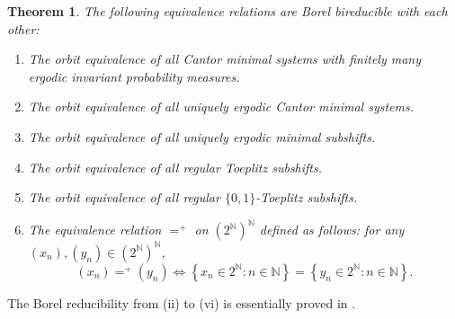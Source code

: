 \documentclass{amsart}
\newtheorem{theorem}{Theorem}[section]
\theoremstyle{definition}
\theoremstyle{problem}
\theoremstyle{remark}
\numberwithin{equation}{section}
\begin{document}
\begin{theorem} \label{thm:main1} The following equivalence relations are Borel bireducible with each other:
\begin{enumerate}
\item[\rm (i)] The orbit equivalence of all Cantor  minimal systems with finitely many ergodic invariant probability measures.
\item[\rm (ii)] The orbit equivalence of all uniquely ergodic Cantor minimal systems.
\item[\rm (iii)] The orbit equivalence of all uniquely ergodic minimal subshifts.
\item[\rm (iv)] The orbit equivalence of all regular Toeplitz subshifts.
\item[\rm (v)] The orbit equivalence of all regular $\{0,1\}$-Toeplitz subshifts.
\item[\rm (vi)] The equivalence relation $=^+$ on $(2^{\mathbb{N}})^{\mathbb{N}}$ defined as follows: for any $(x_n), (y_n)\in (2^{\mathbb{N}})^{\mathbb{N}}$, 
$$ (x_n)=^+(y_n)\iff \left\{x_n\in 2^{\mathbb{N}}\colon n\in \mathbb{N}\right\}=\left\{y_n\in 2^{\mathbb{N}}\colon n\in \mathbb{N}\right\}. $$
\end{enumerate}
\end{theorem}
The Borel reducibility from (ii) to (vi) is essentially proved in \cite[Corollary 1]{GPS}.
\end{document}
